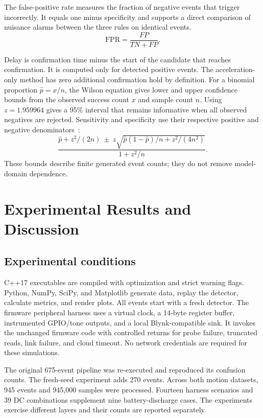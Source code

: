 \documentclass[10pt,a4paper]{article}
\begin{document}
The false-positive rate measures the fraction of negative events that trigger incorrectly. It equals one minus specificity and supports a direct comparison of nuisance alarms between the three rules on identical events.
\begin{equation}\label{eq:fpr} \mathrm{FPR}=\frac{FP}{TN+FP}.\end{equation}

Delay is confirmation time minus the start of the candidate that reaches confirmation. It is computed only for detected positive events. The acceleration-only method has zero additional confirmation hold by definition. For a binomial proportion $\hat p=x/n$, the Wilson equation gives lower and upper confidence bounds from the observed success count $x$ and sample count $n$. Using $z=1.959964$ gives a 95\% interval that remains informative when all observed negatives are rejected. Sensitivity and specificity use their respective positive and negative denominators~\cite{wilson1927interval}:
\begin{equation}
\frac{\hat p+z^2/(2n)\ \pm\ z\sqrt{\hat p(1-\hat p)/n+z^2/(4n^2)}}{1+z^2/n}.
\end{equation}
These bounds describe finite generated event counts; they do not remove model-domain dependence.

\section{Experimental Results and Discussion}
\subsection{Experimental conditions}
C++17 executables are compiled with optimization and strict warning flags. Python, NumPy, SciPy, and Matplotlib generate data, replay the detector, calculate metrics, and render plots. All events start with a fresh detector. The firmware peripheral harness uses a virtual clock, a 14-byte register buffer, instrumented GPIO/tone outputs, and a local Blynk-compatible sink. It invokes the unchanged firmware code with controlled returns for probe failure, truncated reads, link failure, and cloud timeout. No network credentials are required for these simulations.

The original 675-event pipeline was re-executed and reproduced its confusion counts. The fresh-seed experiment adds 270 events. Across both motion datasets, 945 events and 945,000 samples were processed. Fourteen harness scenarios and 39 DC combinations supplement nine battery-discharge cases. The experiments exercise different layers and their counts are reported separately.
\end{document}

